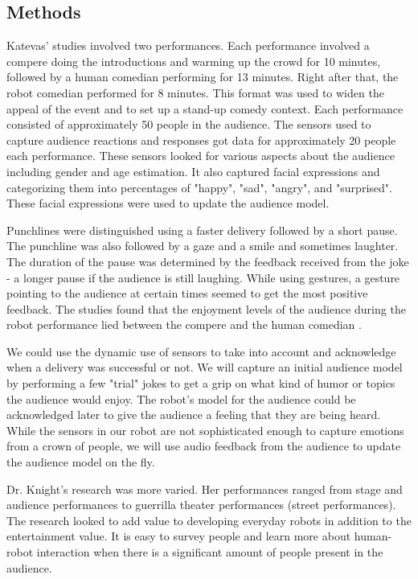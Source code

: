 \subsection{Methods}

Katevas' studies involved two performances. Each performance involved a compere doing the introductions and warming up the crowd for 10 minutes, followed by a human comedian performing for 13 minutes. Right after that, the robot comedian performed for 8 minutes. This format was used to widen the appeal of the event and to set up a stand-up comedy context. Each performance consisted of approximately 50 people in the audience. The sensors used to capture audience reactions and responses got data for approximately 20 people each performance. These sensors looked for various aspects about the audience including gender and age estimation. It also captured facial expressions and categorizing them into percentages of "happy", "sad", "angry", and "surprised". These facial expressions were used to update the audience model.

Punchlines were distinguished using a faster delivery followed by a short pause. The punchline was also followed by a gaze and a smile and sometimes laughter. The duration of the pause was determined by the feedback received from the joke - a longer pause if the audience is still laughing. While using gestures, a gesture pointing to the audience at certain times seemed to get the most positive feedback. The studies found that the enjoyment levels of the audience during the robot performance lied between the compere and the human comedian \cite{RobotComedyLab:2015}.

We could use the dynamic use of sensors to take into account and acknowledge when a delivery was successful or not. We will capture an initial audience model by performing a few "trial" jokes to get a grip on what kind of humor or topics the audience would enjoy. The robot's model for the audience could be acknowledged later to give the audience a feeling that they are being heard. While the sensors in our robot are not sophisticated enough to capture emotions from a crown of people, we will use audio feedback from the audience to update the audience model on the fly.

Dr. Knight's research was more varied. Her performances ranged from stage and audience performances to guerrilla theater performances (street performances). The research looked to add value to developing everyday robots in addition to the entertainment value. It is easy to survey people and learn more about human-robot interaction when there is a significant amount of people present in the audience.

